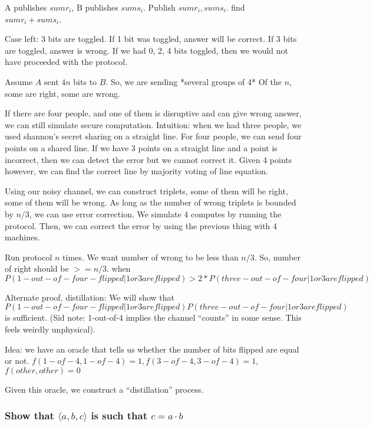 \documentclass[11pt]{article}
\begin{document}
  A publishes $sum r_i$, B publishes $sum s_i$. Publish $sum r_i, sum s_i$. find $sum r_i + sum s_i$.


 Case left: 3 bits are toggled. If 1 bit was toggled, answer will be correct. If 3 bits are toggled, answer is wrong.
  If we had 0, 2, 4 bits toggled, then we would not have proceeded with the protocol.

  Assume $A$ sent $4n$ bits to $B$. So, we are sending *several groups of 4* Of the $n$, some are right, some are wrong.

  If there are four people, and one of them is disruptive and can give wrong answer, we can still simulate  secure computation.
  Intuition: when we had three people, we used shannon's secret sharing on a straight line. For four people, we can send
  four points on a shared line. If we have 3 points on a straight line and a point is incorrect, then we can detect the error
  but we cannot correct it. Given 4 points however, we can find the correct line by majority voting of line equation.

  Using our noisy channel, we can construct triplets, some of them will be right, some of them will be wrong.
  As long as the number of wrong triplets is bounded by $n/3$, we can use error correction.
  We simulate 4 computes by running the protocol. Then, we can correct the error by using the previous thing with 4 machines.

  Run protocol $n$ times. We want number of wrong to be less than $n / 3$. So, number of right should be $>= n / 3$.
  when $P(1-out-of-four-flipped | 1 or 3 are flipped) > 2 * P(three-out-of-four | 1 or 3 are flipped)$


 Alternate proof, distillation:
  We will show that $P(1-out-of-four-flipped | 1 or 3 are flipped) P(three-out-of-four | 1 or 3 are flipped)$ is sufficient.
  (Sid note: 1-out-of-4 implies the channel ``counts'' in some sense. This feels weirdly unphysical).

  Idea: we have an oracle that tells us whether the number of bits flipped are equal or not. $f(1-of-4, 1-of-4) = 1, f(3-of-4, 3-of-4) = 1$,
  $f(other, other) = 0$

  Given this oracle, we construct a ``distillation'' process.

\subsubsection{Show that $\langle a, b, c \rangle$ is such that $c = a \cdot b$}
\end{document}
